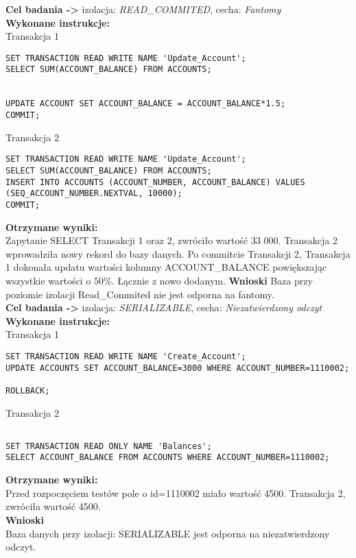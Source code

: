\documentclass[11pt,oneside, a4paper]{article}
\begin{document}
\textbf{Cel badania ->} izolacja:
\textit{READ\_COMMITED}, cecha:
\textit{Fantomy} \\
\textbf{Wykonane instrukcje: } \\
Transakcja 1
\begin{lstlisting}
SET TRANSACTION READ WRITE NAME 'Update_Account';
SELECT SUM(ACCOUNT_BALANCE) FROM ACCOUNTS;


UPDATE ACCOUNT SET ACCOUNT_BALANCE = ACCOUNT_BALANCE*1.5;
COMMIT;
\end{lstlisting}
Transakcja 2
\begin{lstlisting}
SET TRANSACTION READ WRITE NAME 'Update_Account';
SELECT SUM(ACCOUNT_BALANCE) FROM ACCOUNTS;
INSERT INTO ACCOUNTS (ACCOUNT_NUMBER, ACCOUNT_BALANCE) VALUES (SEQ_ACCOUNT_NUMBER.NEXTVAL, 10000);
COMMIT;
\end{lstlisting}
\textbf{Otrzymane wyniki:} \\
    Zapytanie SELECT Transakcji 1 oraz 2, zwróciło  wartość 33 000. Transakcja 2 wprowadziła nowy rekord do bazy danych. Po commitcie Transakcji 2, Transakcja 1 dokonała updatu wartości kolumny ACCOUNT\_BALANCE powiększając wszystkie wartości o 50\%. Łącznie z nowo dodanym.
\textbf{Wnioski } Baza przy poziomie izolacji Read\_Commited nie jest odporna na fantomy.\\
\textbf{Cel badania ->} izolacja:
\textit{SERIALIZABLE}, cecha:
\textit{Niezatwierdzony odczyt} \\
\textbf{Wykonane instrukcje: } \\
Transakcja 1
\begin{lstlisting}
SET TRANSACTION READ WRITE NAME 'Create_Account';
UPDATE ACCOUNTS SET ACCOUNT_BALANCE=3000 WHERE ACCOUNT_NUMBER=1110002;

ROLLBACK;
\end{lstlisting}
Transakcja 2
\begin{lstlisting}

SET TRANSACTION READ ONLY NAME 'Balances';
SELECT ACCOUNT_BALANCE FROM ACCOUNTS WHERE ACCOUNT_NUMBER=1110002;
\end{lstlisting}
\textbf{Otrzymane wyniki:} \\
    Przed rozpoczęciem testów pole o id=1110002 miało wartość 4500. Transakcja 2, zwróciła  wartość 4500.\\
\textbf{Wnioski} \\
    Baza danych przy izolacji: SERIALIZABLE jest odporna na niezatwierdzony odczyt. \\
\end{document}
